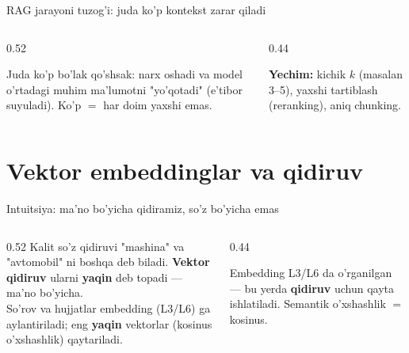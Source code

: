 \documentclass[aspectratio=169,11pt]{beamer}
\begin{document}
\begin{frame}{RAG jarayoni tuzog'i: juda ko'p kontekst zarar qiladi}
  \begin{columns}[T]
    \begin{column}{0.52\textwidth}
      \begin{tcolorbox}[warnbox,title={"Lost in the middle"}]
        \small
        Juda ko'p bo'lak qo'shsak: narx oshadi va model o'rtadagi muhim
        ma'lumotni "yo'qotadi" (e'tibor suyuladi). Ko'p $=$ har doim yaxshi emas.
      \end{tcolorbox}
    \end{column}
    \begin{column}{0.44\textwidth}
      \begin{tcolorbox}[okbox,top=2pt,bottom=2pt]
        \footnotesize
        \textbf{Yechim:} kichik $k$ (masalan 3--5), yaxshi tartiblash
        (reranking), aniq chunking.
      \end{tcolorbox}
    \end{column}
  \end{columns}
\end{frame}

\section[Embeddinglar]{Vektor embeddinglar va qidiruv}

\begin{frame}{Intuitsiya: ma'no bo'yicha qidiramiz, so'z bo'yicha emas}
  \begin{columns}[T]
    \begin{column}{0.52\textwidth}
      \small
      Kalit so'z qidiruvi "mashina" va "avtomobil" ni boshqa deb biladi.
      \textbf{Vektor qidiruv} ularni \textbf{yaqin} deb topadi --- ma'no
      bo'yicha.\\[5pt]
      So'rov va hujjatlar embedding (L3/L6) ga aylantiriladi; eng \textbf{yaqin}
      vektorlar (kosinus o'xshashlik) qaytariladi.
    \end{column}
    \begin{column}{0.44\textwidth}
      \begin{tcolorbox}[okbox,top=2pt,bottom=2pt]
        \footnotesize
        Embedding L3/L6 da o'rganilgan --- bu yerda \textbf{qidiruv} uchun
        qayta ishlatiladi. Semantik o'xshashlik $=$ kosinus.
      \end{tcolorbox}
    \end{column}
  \end{columns}
\end{frame}
\end{document}
